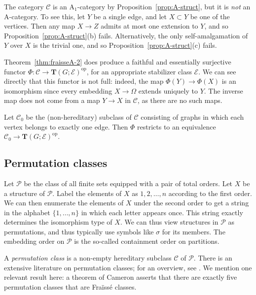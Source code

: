 \documentclass[12pt]{amsart}
\numberwithin{equation}{section}
\theoremstyle{definition}
\newcommand{\rA}{\mathrm{A}}
\newcommand{\cC}{\mathcal{C}}
\newcommand{\sE}{\mathscr{E}}
\newcommand{\cP}{\mathcal{P}}
\newcommand{\bT}{\mathbf{T}}
\newcommand{\defn}[1]{\emph{#1}}
\newcommand{\op}{\mathrm{op}}
\begin{document}
The category $\cC$ is an $\rA_1$-category by Proposition~\ref{prop:A-struct}, but it is \emph{not} an $\rA$-category. To see this, let $Y$ be a single edge, and let $X \subset Y$ be one of the vertices. Then any map $X \to Z$ admits at most one extension to $Y$, and so Proposition~\ref{prop:A-struct}(b) fails. Alternatively, the only self-amalgamation of $Y$ over $X$ is the trivial one, and so Proposition~\ref{prop:A-struct}(c) fails.

Theorem~\ref{thm:fraisseA-2} does produce a faithful and essentially surjective functor $\Phi \colon \cC \to \bT(G; \sE)^{\op}$, for an appropriate stabilizer class $\sE$. We can see directly that this functor is not full: indeed, the map $\Phi(Y) \to \Phi(X)$ is an isomorphism since every embedding $X \to \Omega$ extends uniquely to $Y$. The inverse map does not come from a map $Y \to X$ in $\cC$, as there are no such maps.

Let $\cC_0$ be the (non-hereditary) subclass of $\cC$ consisting of graphs in which each vertex belongs to exactly one edge. Then $\Phi$ restricts to an equivalence $\cC_0 \to \bT(G; \sE)^{\op}$.

\subsection{Permutation classes}

Let $\cP$ be the class of all finite sets equipped with a pair of total orders. Let $X$ be a structure of $\cP$. Label the elements of $X$ as $1, 2, \ldots, n$ according to the first order. We can then enumerate the elements of $X$ under the second order to get a string in the alphabet $\{1,\ldots,n\}$ in which each letter appears once. This string exactly determines the isomorphism type of $X$. We can thus view structures in $\cP$ as permutations, and thus typically use symbols like $\sigma$ for its members. The embedding order on $\cP$ is the so-called containment order on partitions.

A \defn{permutation class} is a non-empty hereditary subclass $\cC$ of $\cP$. There is an extensive literature on permutation classes; for an overview, see \cite{Vatter}. We mention one relevant result here: a theorem of Cameron \cite{CameronPerm} asserts that there are exactly five permutation classes that are Fra\"iss\'e classes.
\end{document}
